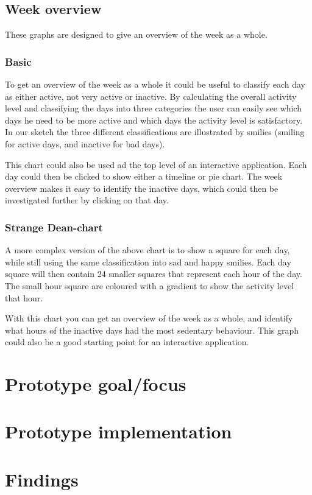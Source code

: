 \subsection{Week overview}
These graphs are designed to give an overview of the week as a whole. %
\subsubsection{Basic}
To get an overview of the week as a whole it could be useful to classify each day as either active, not very active or inactive. By calculating the overall activity level and classifying the days into three categories the user can easily see which days he need to be more active and which days the activity level is satisfactory. In our sketch the three different classifications are illustrated by smilies (smiling for active days, and inactive for bad days). 

This chart could also be used ad the top level of an interactive application. Each day could then be clicked to show either a timeline or pie chart. The week overview makes it easy to identify the inactive days, which could then be investigated further by clicking on that day.

\subsubsection{Strange Dean-chart}
A more complex version of the above chart is to show a square for each day, while still using the same classification into sad and happy smilies. Each day square will then contain 24 smaller squares that represent each hour of the day. The small hour square are coloured with a gradient to show the activity level that hour.

With this chart you can get an overview of the week as a whole, and identify what hours of the inactive days had the most sedentary behaviour. This graph could also be a good starting point for an interactive application.

\section{Prototype goal/focus}

\section{Prototype implementation}

\section{Findings}

